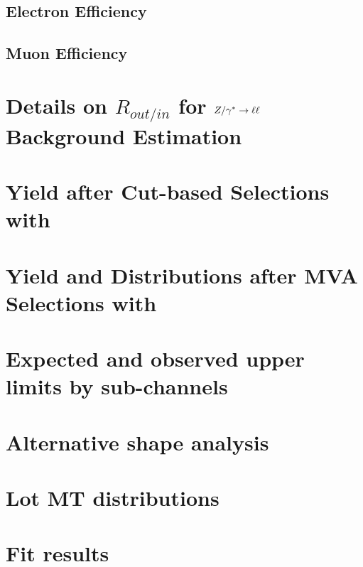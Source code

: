 \documentclass{cmspaper}
\begin{document}
     \subsection{Electron Efficiency}
     
     \subsection{Muon Efficiency}
     

\clearpage 

\section{ Details on $R_{out/in}$ for $Z/\gamma^*\to\ell\ell$ Background Estimation}
     \label{app:appendix_dyr}
     
\clearpage




\clearpage 

  \section{Yield after Cut-based Selections with \intlumi }
     \label{app:appendix_cutresults}
     
\clearpage

  \section{Yield and Distributions after MVA Selections with \intlumi }
     \label{app:appendix_bdtresults}
     

\clearpage

  \section{Expected and observed upper limits by sub-channels}
     \label{app:subchannels}
     

\clearpage
  \section{Alternative shape analysis}
     \label{app:appendix_altshape}
     

\clearpage
  \section{Lot MT distributions}
     \label{app:appendix_lowmt}
     
 
\clearpage
  \section{Fit results}
     \label{app:appendix_fit}
     

%  
\end{document}
